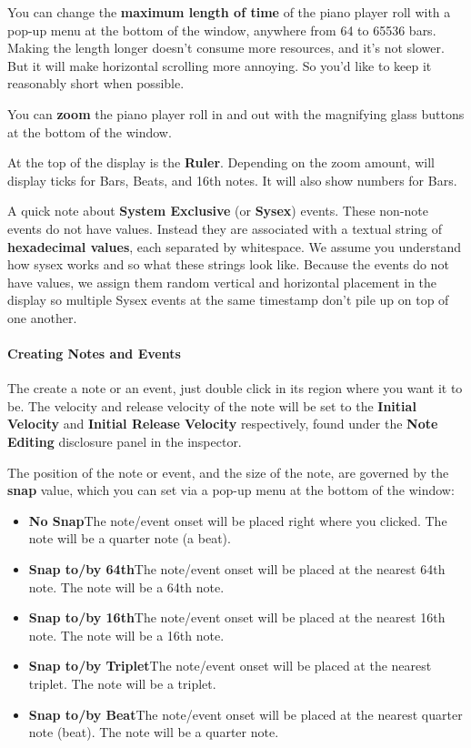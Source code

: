 \documentclass[twoside,10pt]{article}
\begin{document}
 You can change the {\bf maximum length of time} of the piano player roll with a pop-up menu at the bottom of the window, anywhere from 64 to 65536 bars.  Making the length longer doesn't consume more resources, and it's not slower.  But it will make horizontal scrolling more annoying.  So you'd like to keep it reasonably short when possible.

You can {\bf zoom} the piano player roll in and out with the magnifying glass buttons at the bottom of the window.

At the top of the display is the {\bf Ruler}.  Depending on the zoom amount, will display ticks for Bars, Beats, and 16th notes.  It will also show numbers for Bars.

A quick note about {\bf System Exclusive} (or {\bf Sysex}) events.  These non-note events do not have values.  Instead they are associated with a textual string of {\bf hexadecimal values}, each separated by whitespace.  We assume you understand how sysex works and so what these strings look like.  Because the events do not have values, we assign them random vertical and horizontal placement in the display so multiple Sysex events at the same timestamp don't pile up on top of one another.

\paragraph{Creating Notes and Events}

The create a note or an event, just double click in its region where you want it to be.  The velocity and release velocity of the note will be set to the {\bf Initial Velocity} and {\bf Initial Release Velocity} respectively, found under the {\bf Note Editing} disclosure panel in the inspector.

The position of the note or event, and the size of the note, are governed by the {\bf snap} value, which you can set via a pop-up menu at the bottom of the window:

\begin{itemize}
\item {\bf No Snap}\qquad The note/event onset will be placed right where you clicked.  The note will be a quarter note (a beat).
\item {\bf Snap to/by 64th}\qquad The note/event onset will be placed at the nearest 64th note.  The note will be a 64th note.
\item {\bf Snap to/by 16th}\qquad The note/event onset will be placed at the nearest 16th note.  The note will be a 16th note.
\item {\bf Snap to/by Triplet}\qquad The note/event onset will be placed at the nearest triplet.  The note will be a triplet.
\item {\bf Snap to/by Beat}\qquad The note/event onset will be placed at the nearest quarter note (beat).  The note will be a quarter note.
\end{itemize}
\end{document}
